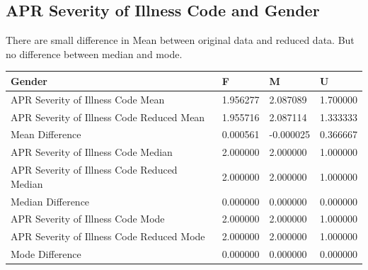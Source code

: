 \documentclass[
	letterpaper, %
]{jdf}
\begin{document}
\subsection{APR Severity of Illness Code and Gender}
There are small difference in Mean between original data and reduced data. But no difference between median and mode.  
\begin{jdftable}
\label{table:Example}
\small %
\begin{tabular}{@{} llll}
\textbf{Gender} & \textbf{F} &\textbf{M} & \textbf{U}\\
	\toprule[0.5pt]

APR Severity of Illness Code Mean           &  1.956277 &  2.087089 &  1.700000 \\\midrule
APR Severity of Illness Code Reduced Mean   &  1.955716 &  2.087114 &  1.333333 \\\midrule
Mean Difference                             &  0.000561 & -0.000025 &  0.366667 \\\midrule
APR Severity of Illness Code Median         &  2.000000 &  2.000000 &  1.000000 \\\midrule
APR Severity of Illness Code Reduced Median &  2.000000 &  2.000000 &  1.000000 \\\midrule
Median Difference                           &  0.000000 &  0.000000 &  0.000000 \\\midrule
APR Severity of Illness Code Mode           &  2.000000 &  2.000000 &  1.000000 \\\midrule
APR Severity of Illness Code Reduced Mode   &  2.000000 &  2.000000 &  1.000000 \\\midrule
Mode Difference                             &  0.000000 &  0.000000 &  0.000000 \\
\end{tabular}
\end{jdftable}
\end{document}
